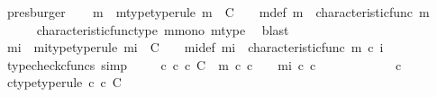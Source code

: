 \begin{isabellebody}
\ presburger\isanewline
\ \ \isamarkupfalse%
\ {\isasymchi}m\ \ {\isasymchi}m{\isacharunderscore}{\kern0pt}type{\isacharbrackleft}{\kern0pt}type{\isacharunderscore}{\kern0pt}rule{\isacharbrackright}{\kern0pt}{\isacharcolon}{\kern0pt}\ {\isachardoublequoteopen}{\isasymchi}m\ {\isacharcolon}{\kern0pt}\ C\ {\isasymrightarrow}\ {\isasymOmega}{\isachardoublequoteclose}\ \ {\isasymchi}m{\isacharunderscore}{\kern0pt}def{\isacharcolon}{\kern0pt}\ {\isachardoublequoteopen}{\isasymchi}m\ {\isacharequal}{\kern0pt}\ characteristic{\isacharunderscore}{\kern0pt}func\ m{\isachardoublequoteclose}\isanewline
\ \ \ \ \isamarkupfalse%
\ characteristic{\isacharunderscore}{\kern0pt}func{\isacharunderscore}{\kern0pt}type\ m{\isacharunderscore}{\kern0pt}mono\ m{\isacharunderscore}{\kern0pt}type\ \isamarkupfalse%
\ blast\isanewline
\ \ \isamarkupfalse%
\ {\isasymchi}mi\ \ {\isasymchi}mi{\isacharunderscore}{\kern0pt}type{\isacharbrackleft}{\kern0pt}type{\isacharunderscore}{\kern0pt}rule{\isacharbrackright}{\kern0pt}{\isacharcolon}{\kern0pt}\ {\isachardoublequoteopen}{\isasymchi}mi\ {\isacharcolon}{\kern0pt}\ C\ {\isasymrightarrow}\ {\isasymOmega}{\isachardoublequoteclose}\ \ {\isasymchi}mi{\isacharunderscore}{\kern0pt}def{\isacharcolon}{\kern0pt}\ {\isachardoublequoteopen}{\isasymchi}mi\ {\isacharequal}{\kern0pt}\ characteristic{\isacharunderscore}{\kern0pt}func\ {\isacharparenleft}{\kern0pt}m\ {\isasymcirc}\isactrlsub c\ i{\isacharparenright}{\kern0pt}{\isachardoublequoteclose}\isanewline
\ \ \ \ \isamarkupfalse%
\ {\isacharparenleft}{\kern0pt}typecheck{\isacharunderscore}{\kern0pt}cfuncs{\isacharcomma}{\kern0pt}\ simp{\isacharparenright}{\kern0pt}\isanewline
\ \ \isamarkupfalse%
\ {\isachardoublequoteopen}{\isasymAnd}\ c{\isachardot}{\kern0pt}\ c\ {\isasymin}\isactrlsub c\ C\ {\isasymLongrightarrow}\ {\isacharparenleft}{\kern0pt}{\isasymchi}m\ {\isasymcirc}\isactrlsub c\ c\ {\isacharequal}{\kern0pt}\ {\isasymt}{\isacharparenright}{\kern0pt}\ {\isacharequal}{\kern0pt}\ {\isacharparenleft}{\kern0pt}{\isasymchi}mi\ {\isasymcirc}\isactrlsub c\ c\ {\isacharequal}{\kern0pt}\ {\isasymt}{\isacharparenright}{\kern0pt}{\isachardoublequoteclose}\isanewline
\ \ \isamarkupfalse%
\ {\isacharminus}{\kern0pt}\isanewline
\ \ \ \ \isamarkupfalse%
\ c\isanewline
\ \ \ \ \isamarkupfalse%
\ c{\isacharunderscore}{\kern0pt}type{\isacharbrackleft}{\kern0pt}type{\isacharunderscore}{\kern0pt}rule{\isacharbrackright}{\kern0pt}{\isacharcolon}{\kern0pt}\ {\isachardoublequoteopen}c\ {\isasymin}\isactrlsub c\ C{\isachardoublequoteclose}\isanewline

\end{isabellebody}
